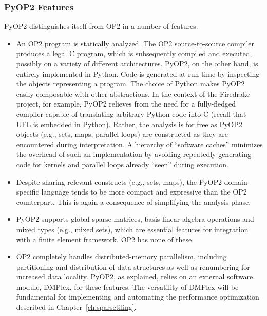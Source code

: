 \subsubsection{PyOP2 Features}
PyOP2 distinguishes itself from OP2 in a number of features.

\begin{itemize}
\item An OP2 program is statically analyzed. The OP2 source-to-source compiler produces a legal C program, which is subsequently compiled and executed, possibly on a variety of different architectures. PyOP2, on the other hand, is entirely implemented in Python. Code is generated at run-time by inspecting the objects representing a program. The choice of Python makes PyOP2 easily composable with other abstractions. In the context of the Firedrake project, for example, PyOP2 relieves from the need for a fully-fledged compiler capable of translating arbitrary Python code into C (recall that UFL is embedded in Python). Rather, the analysis is for free as PyOP2 objects (e.g., sets, maps, parallel loops) are constructed as they are encountered during interpretation. A hierarchy of ``software caches'' minimizes the overhead of such an implementation by avoiding repeatedly generating code for kernels and parallel loops already ``seen'' during execution.

\item Despite sharing relevant constructs (e.g., sets, maps), the PyOP2 domain specific language tends to be more compact and expressive than the OP2 counterpart. This is again a consequence of simplifying the analysis phase.

\item PyOP2 supports global sparse matrices, basis linear algebra operations and mixed types (e.g., mixed sets), which are essential features for integration with a finite element framework. OP2 has none of these. 

\item OP2 completely handles distributed-memory parallelism, including partitioning and distribution of data structures as well as renumbering for increased data locality. PyOP2, as explained, relies on an external software module, DMPlex, for these features. The versatility of DMPlex will be fundamental for implementing and automating the performance optimization described in Chapter~\ref{ch:sparsetiling}.
\end{itemize}



